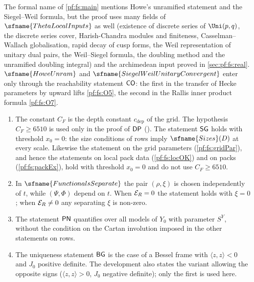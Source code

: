 \begin{remark}\label{pf:fs:rem:name}
The formal name of \cref{pf:fs:main} mentions Howe's unramified statement and the Siegel--Weil formula, but the proof uses many fields
of $\sfname{ThetaLocalInputs}$ as well (existence of discrete series of $\Uni(p,q)$, the discrete series cover, Harish-Chandra modules
and finiteness, Casselman--Wallach globalisation, rapid decay of cusp forms, the Weil representation of unitary dual pairs, the
Weil--Siegel formula, the doubling method and the unramified doubling integral) and the archimedean input proved in
\cref{sec:pf:fs:real}. $\sfname{HoweUnram}$ and $\sfname{SiegelWeilUnitaryConvergent}$ enter only through the reachability statement
$\mathsf{CO}$: the first in the transfer of Hecke parameters by upward lifts \ref{pf:fs:O5}, the second in the Rallis inner product formula
\ref{pf:fs:O7}.
\end{remark}

\begin{remark}\label{pf:fs:rem:thresholds}
\begin{enumerate}[label=(\alph*)]
\item The constant $C_F$ is the depth constant $c_{\mathrm{dep}}$ of the grid. The hypothesis $C_F\ge6510$ is used only in the proof of
$\mathsf{DP}$ (). The statement $\mathsf{SG}$ holds with threshold $x_0=0$: the size
conditions of rows imply $\sfname{Sizes}(D)$ at every scale. Likewise the statement on the grid parameters (\cref{pf:fs:gridPar}), and hence
the statements on local pack data (\cref{pf:fs:locOK}) and on packs (\cref{pf:fs:packEx}), hold with threshold $x_0=0$ and do not use
$C_F\ge6510$.
\item In $\sfname{FunctionalsSeparate}$ the pair $(\rho,\xi)$ is chosen independently of $t$, while $(\Psi,\Phi)$ depend on $t$. When
$\mathcal E_R=0$ the statement holds with $\xi=0$; when $\mathcal E_R\ne0$ any separating $\xi$ is non-zero.
\item The statement $\mathsf{PN}$ quantifies over all models of $Y_0$ with parameter $S^Y$, without the condition on the Cartan involution
imposed in the other statements on rows.
\item The uniqueness statement $\mathsf{BG}$ is the case of a Bessel frame with $\langle z,z\rangle<0$ and $J_0$ positive definite. The
development also states the variant allowing the opposite signs ($\langle z,z\rangle>0$, $J_0$ negative definite); only the first is used here.
\end{enumerate}
\end{remark}

